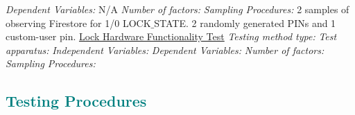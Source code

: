 \newline
\textit{Dependent Variables:} N/A
\newline
\textit{Number of factors:}
\newline
\textit{Sampling Procedures:} 2 samples of observing Firestore for 1/0 LOCK$\_$STATE. 2 randomly generated PINs and 1 custom-user pin.
\newline
\newline
\underline{Lock Hardware Functionality Test}
\newline
\textit{Testing method type:} 
\newline
\textit{Test apparatus:} 
\newline
\textit{Independent Variables:} 
\newline
\textit{Dependent Variables:} 
\newline
\textit{Number of factors:}
\newline
\textit{Sampling Procedures:} 
\newline
\textcolor{teal}{\subsection{Testing Procedures}}